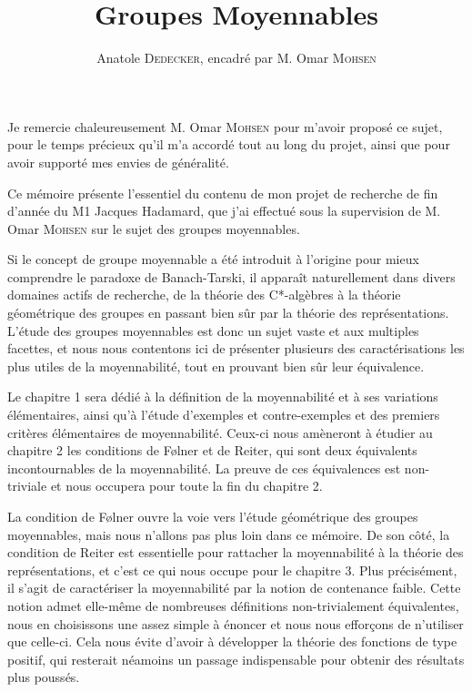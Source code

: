 \documentclass[a4paper,12pt]{article}
\begin{document}
\begin{titlepage}
\title{Groupes Moyennables}
\author{Anatole \textsc{Dedecker}, encadré par M. Omar \textsc{Mohsen}}
\maketitle
{}
\thispagestyle{empty}
\end{titlepage}

\vspace*{\fill}

\thispagestyle{empty}

Je remercie chaleureusement M. Omar \textsc{Mohsen} pour m'avoir proposé ce sujet, 
pour le temps précieux qu'il m'a accordé tout au long du projet, 
ainsi que pour avoir supporté mes envies de généralité.

\vspace*{\fill}

\clearpage

\tableofcontents
\thispagestyle{empty}

\clearpage


Ce mémoire présente l'essentiel du contenu de mon projet de recherche de fin d'année
du M1 Jacques Hadamard, que j'ai effectué sous la supervision de M. Omar \textsc{Mohsen}
sur le sujet des groupes moyennables. 

Si le concept de groupe moyennable a été introduit à l'origine pour mieux comprendre le paradoxe de 
Banach-Tarski, il apparaît naturellement dans divers domaines actifs de recherche, 
de la théorie des C*-algèbres à la théorie géométrique des groupes en passant bien sûr 
par la théorie des représentations. L'étude des groupes moyennables est donc un sujet vaste et aux multiples facettes,
et nous nous contentons ici de présenter plusieurs des caractérisations les plus utiles 
de la moyennabilité, tout en prouvant bien sûr leur équivalence. 

Le chapitre 1 sera dédié à la définition de la moyennabilité et à ses variations élémentaires,
ainsi qu'à l'étude d'exemples et contre-exemples et des premiers critères élémentaires de moyennabilité.
Ceux-ci nous amèneront à étudier au chapitre 2 les conditions de F\o{}lner et de Reiter, qui sont 
deux équivalents incontournables de la moyennabilité. La preuve de ces équivalences est non-triviale 
et nous occupera pour toute la fin du chapitre 2.

La condition de F\o{}lner ouvre la voie vers l'étude géométrique des groupes moyennables, mais nous n'allons pas plus loin dans ce mémoire.
De son côté, la condition de Reiter est essentielle pour rattacher la moyennabilité à 
la théorie des représentations, et c'est ce qui nous occupe pour le chapitre 3. Plus précisément, il s'agit de 
caractériser la moyennabilité par la notion de contenance faible. Cette notion admet elle-même de 
nombreuses définitions non-trivialement équivalentes, nous en choisissons une assez simple à énoncer 
et nous nous efforçons de n'utiliser que celle-ci. Cela nous évite d'avoir à développer la théorie des 
fonctions de type positif, qui resterait néamoins un passage indispensable pour obtenir des résultats plus poussés.
\end{document}

